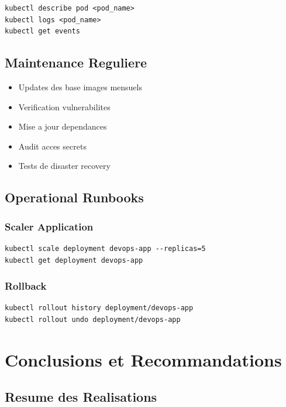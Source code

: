 \documentclass[12pt,a4paper]{report}
\begin{document}
\begin{lstlisting}
kubectl describe pod <pod_name>
kubectl logs <pod_name>
kubectl get events
\end{lstlisting}

\section{Maintenance Reguliere}

\begin{itemize}
    \item Updates des base images mensuels
    \item Verification vulnerabilites
    \item Mise a jour dependances
    \item Audit acces secrets
    \item Tests de disaster recovery
\end{itemize}

\section{Operational Runbooks}

\subsection{Scaler Application}

\begin{lstlisting}
kubectl scale deployment devops-app --replicas=5
kubectl get deployment devops-app
\end{lstlisting}

\subsection{Rollback}

\begin{lstlisting}
kubectl rollout history deployment/devops-app
kubectl rollout undo deployment/devops-app
\end{lstlisting}

\newpage

\chapter{Conclusions et Recommandations}

\section{Resume des Realisations}
\end{document}
